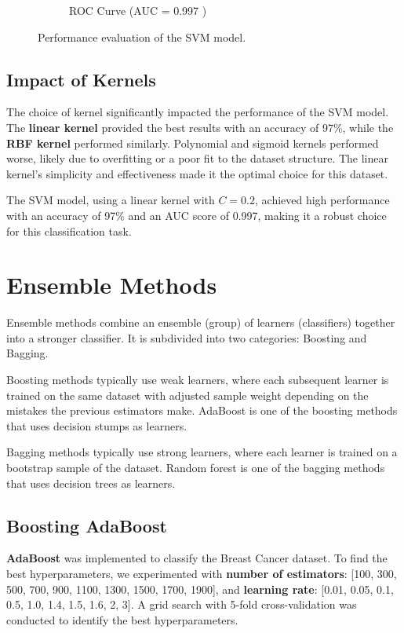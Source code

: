 \documentclass[12pt]{article}
\begin{document}
\begin{figure}[H]
\begin{subfigure}[b]{0.4\textwidth}
        \caption{ROC Curve (AUC = 0.997 )}
        \label{fig:svm_roc}
    \end{subfigure}
    \caption{Performance evaluation of the SVM model.}
    \label{fig:svm_cm_roc}
\end{figure}

\subsection*{Impact of Kernels}

The choice of kernel significantly impacted the performance of the SVM model. The \textbf{linear kernel} provided the best results with an accuracy of 97\%, while the \textbf{RBF kernel} performed similarly. Polynomial and sigmoid kernels performed worse, likely due to overfitting or a poor fit to the dataset structure. The linear kernel’s simplicity and effectiveness made it the optimal choice for this dataset.



The SVM model, using a linear kernel with \(C=0.2\), achieved high performance with an accuracy of 97\% and an AUC score of 0.997, making it a robust choice for this classification task.



\section{Ensemble Methods}
Ensemble methods combine an ensemble (group) of learners (classifiers) together into a stronger classifier. It is subdivided into two categories: Boosting and Bagging.
\par
Boosting methods typically use weak learners, where each subsequent learner is trained on the same dataset with adjusted sample weight depending on the mistakes the previous estimators make. AdaBoost is one of the boosting methods that uses decision stumps as learners.
\par
Bagging methods typically use strong learners, where each learner is trained on a bootstrap sample of the dataset. Random forest is one of the bagging methods that uses decision trees as learners.
\subsection{Boosting \textemdash AdaBoost}
\textbf{AdaBoost} was implemented to classify the Breast Cancer dataset. To find the best hyperparameters, we experimented with \textbf{number of estimators}: [100, 300, 500, 700, 900, 1100, 1300, 1500, 1700, 1900], and \textbf{learning rate}: [0.01, 0.05, 0.1, 0.5, 1.0, 1.4, 1.5, 1.6, 2, 3]. A grid search with 5-fold cross-validation was conducted to identify the best hyperparameters.\cite{hastie2009multi}
\end{document}
